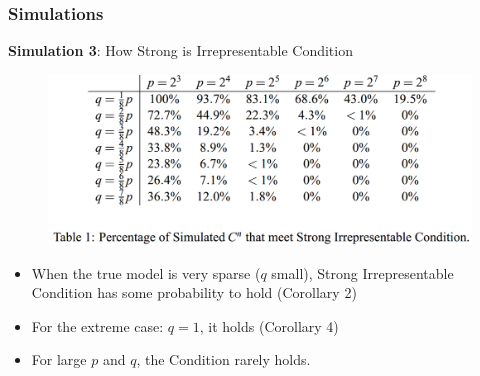 \documentclass{beamer}
\begin{document}
	\begin{frame}
		\frametitle{Simulations}
		\textbf{Simulation 3}: How Strong is Irrepresentable Condition\\
		\begin{figure}
			\includegraphics[width=.8\linewidth]{image018.png}
		\end{figure}
		\begin{itemize}
			\item 
			When the true model is very sparse ($q$ small), Strong Irrepresentable Condition has some probability to hold (Corollary 2)
			\item
			For the extreme case: $q=1$, it holds (Corollary 4)
			\item
			For large $p$ and $q$, the Condition rarely holds.
		\end{itemize}
	\end{frame}
	
	
\end{document}
